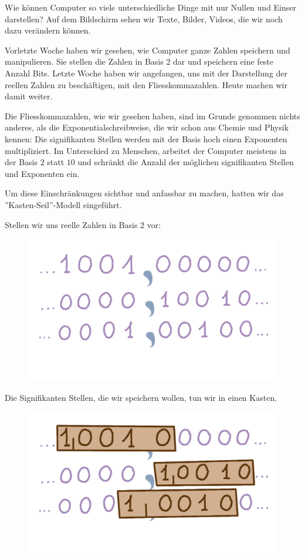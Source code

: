 Wie können Computer so viele unterschiedliche Dinge mit nur Nullen und Einser darstellen? Auf dem Bildschirm sehen wir Texte, Bilder, Videos, die wir noch dazu verändern können.

Vorletzte Woche haben wir gesehen, wie Computer ganze Zahlen speichern und manipulieren. Sie stellen die Zahlen in Basis 2 dar und speichern eine feste Anzahl Bits. Letzte Woche haben wir angefangen, uns mit der Darstellung der reellen Zahlen zu beschäftigen, mit den Fliesskommazahlen. Heute machen wir damit weiter.

Die Fliesskommazahlen, wie wir gesehen haben, sind im Grunde genommen nichts anderes, als die Exponentialschreibweise, die wir schon aus Chemie und Physik kennen: Die signifikanten Stellen werden mit der Basis hoch einen Exponenten multipliziert. Im Unterschied zu Menschen, arbeitet der Computer meistens in der Basis \(2\) statt \(10\) und schränkt die Anzahl der möglichen signifikanten Stellen und Exponenten ein.

Um diese Einschränkungen sichtbar und anfassbar zu machen, hatten wir das ''Kasten-Seil''-Modell eingeführt.

Stellen wir uns reelle Zahlen in Basis 2 vor:

\begin{figure}[H]
\centering
\includegraphics[width=0.65\linewidth]{Pictures/Zahlengerade.png} 
\end{figure}

Die Signifikanten Stellen, die wir speichern wollen, tun wir in einen Kasten.
\begin{figure}[H]
\centering
\includegraphics[width=0.65\linewidth]{Pictures/Kasten.png} 
\end{figure}


